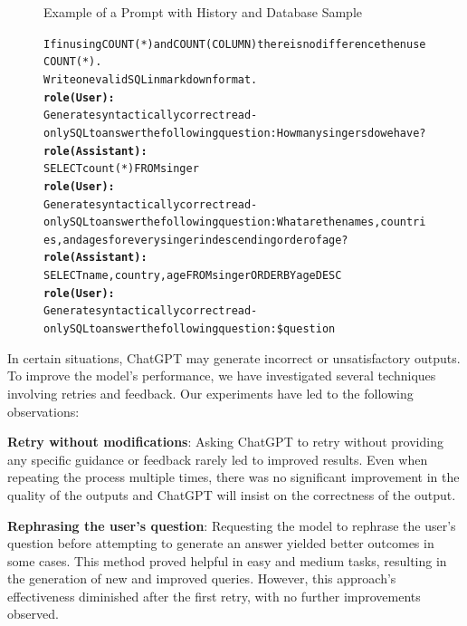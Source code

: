 \begin{figure}[H]
\begin{AIbox}{Example of a Prompt with History and Database Sample}
{\begin{alltt}
            If in using  COUNT(*) and COUNT(COLUMN) there is no difference then use COUNT(*). \\
            Write one valid SQL in markdown format.
            \\
            {\bf role(User):} \\
            Generate syntactically correct read-only SQL to answer the following question: How many singers do we have?
            \\
            {\bf role(Assistant):} \\
            SELECT count(*) FROM singer
            \\
            {\bf role(User):} \\
            Generate syntactically correct read-only SQL to answer the following question: What are the names, countries, and ages for every singer in descending order of age?
            \\
            {\bf role(Assistant):} \\
            SELECT name,  country,  age FROM singer ORDER BY age DESC
            \\
            {\bf role(User):} \\
            Generate syntactically correct read-only SQL to answer the following question: \$question
        \end{alltt}
        }
        \vspace{-5px}
    \end{AIbox}
\end{figure}


In certain situations, ChatGPT may generate incorrect or unsatisfactory outputs. To improve the model's performance, we have investigated several techniques involving retries and feedback. Our experiments have led to the following observations:

\textbf{Retry without modifications}: Asking ChatGPT to retry without providing any specific guidance or feedback rarely led to improved results. Even when repeating the process multiple times, there was no significant improvement in the quality of the outputs and ChatGPT will insist on the correctness of the output.

\textbf{Rephrasing the user's question}: Requesting the model to rephrase the user's question before attempting to generate an answer yielded better outcomes in some cases. This method proved helpful in easy and medium tasks, resulting in the generation of new and improved queries. However, this approach's effectiveness diminished after the first retry, with no further improvements observed.

